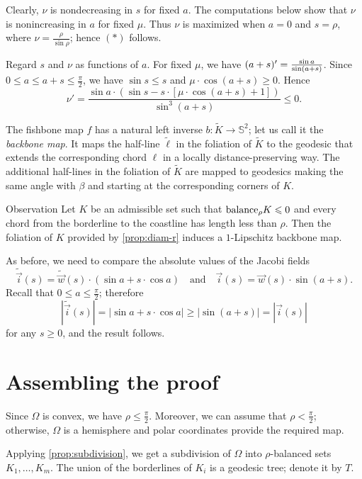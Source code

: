 \documentclass[a4paper,10pt]{article}
\begin{document}
Clearly, $\nu$ is nondecreasing in $s$ for fixed $a$.
The computations below show that $\nu$ is nonincreasing in $a$ for fixed $\mu$.
Thus $\nu$ is maximized when $a=0$ and $s=\rho$, where $\nu=\tfrac{\rho}{\sin\rho}$; hence $({*})$ follows.

Regard $s$ and $\nu$ as functions of $a$.
For fixed $\mu$, we have $(a+s)'\z=\tfrac{\sin a}{\sin(a+s)}$.
Since $0\leqslant a\leqslant a+s\leqslant \tfrac\pi2$, we have $\sin s\leqslant s$ and $\mu\cdot\cos (a+s)\geqslant 0$.
Hence
\[\nu'=\frac{\sin a\cdot (\sin s -s\cdot [\mu\cdot\cos(a+s)+1])}{\sin^3 (a+s)}\leqslant0.\]
\qedsf

The fishbone map $f$ has a natural left inverse $b\colon\tilde K\to \mathbb{S}^2$; let us call it the \emph{backbone map}.
It maps the half-line $\tilde \ell$ in the foliation of $\tilde K$ to the geodesic that extends the corresponding chord $\ell$ in a locally distance-preserving way.
The additional half-lines in the foliation of $\tilde K$ are mapped to geodesics making the same angle with $\beta$ and starting at the corresponding corners of $K$.

\begin{thm}{Observation}\label{obs:backbone}
Let $K$ be an admissible set such that $\mathrm{balance}_\rho K\leqslant 0$ and every chord from the borderline to the coastline has length less than $\rho$.
Then the foliation of $K$ provided by \ref{prop:diam-r} induces a $1$-Lipschitz backbone map.
\end{thm}

As before, we need to compare the absolute values of the Jacobi fields
\[\tilde {\vec i}(s)=\tilde {\vec w}(s)\cdot (\sin a+ s\cdot\cos a)\quad\text{and}\quad{\vec i}(s)= {\vec w}(s)\cdot \sin (a+s).\]
Recall that $0\leqslant a\leqslant \tfrac\pi2$;
therefore
\[|\tilde {\vec i}(s)|=|\sin a+ s\cdot \cos a|\geqslant |\sin (a+s)|=|{\vec i}(s)|\]
for any $s\geqslant0$, and the result follows.
\qeds

\section{Assembling the proof}

Since $\Omega$ is convex, we have $\rho\leqslant \tfrac\pi2$.
Moreover, we can assume that $\rho<\tfrac\pi2$;
otherwise, $\Omega$ is a hemisphere and polar coordinates provide the required map.

Applying \ref{prop:subdivision}, we get a subdivision of $\Omega$ into $\rho$-balanced sets $K_1,\dots,K_m$.
The union of the borderlines of $K_i$ is a geodesic tree; denote it by $T$.
\end{document}
